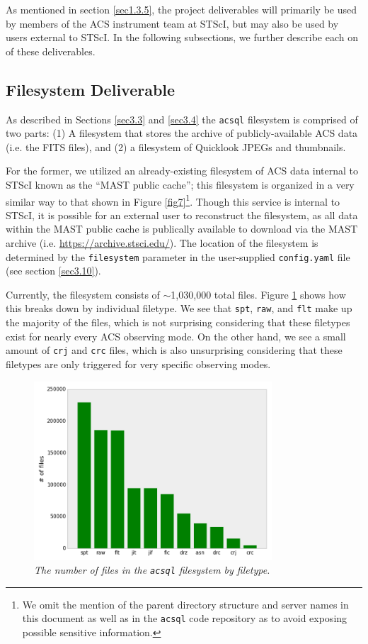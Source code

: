 \documentclass[10pt,journal,compsoc]{IEEEtran}
\begin{document}
As mentioned in section \ref{sec1.3.5}, the project deliverables will primarily be used by members of the ACS instrument team at STScI, but may also be used by users external to STScI.
In the following subsections, we further describe each on of these deliverables.


\subsection{Filesystem Deliverable} \label{sec4.1}

As described in Sections \ref{sec3.3} and \ref{sec3.4} the \texttt{acsql} filesystem is comprised of two parts: (1) A filesystem that stores the archive of publicly-available ACS data (i.e. the
FITS files), and (2) a filesystem of Quicklook JPEGs and thumbnails.

For the former, we utilized an already-existing filesystem of ACS data internal to STScI known as the ``MAST public cache''; this filesystem is organized in a very similar way to that shown in
Figure \ref{fig7}\footnote{We omit the mention of the parent directory structure and server names in this document as well as in the \texttt{acsql} code repository as to avoid exposing possible
sensitive information.}.  Though this service is internal to STScI, it is possible for an external user to reconstruct the filesystem, as all data within the MAST public cache is publically available
to download via the MAST archive (i.e. \textcolor{blue}{\url{https://archive.stsci.edu/}}).  The location of the filesystem is determined by the \texttt{filesystem} parameter in the user-supplied
\texttt{config.yaml} file (see section \ref{sec3.10}).

Currently, the filesystem consists of $\sim$1,030,000 total files. Figure \ref{fig29} shows how this breaks down by individual filetype.  We see that \texttt{spt}, \texttt{raw}, and \texttt{flt}
make up the majority of the files, which is not surprising considering that these filetypes exist for nearly every ACS observing mode.  On the other hand, we see a small amount of \texttt{crj} and
\texttt{crc} files, which is also unsurprising considering that these filetypes are only triggered for very specific observing modes.

\begin{figure}[!h]
\centering
\includegraphics[width=3.5in]{./figures/num_files_by_filetype.png}
\caption{\textit{The number of files in the \texttt{acsql} filesystem by filetype.}}
\label{fig29}
\end{figure}
\end{document}
